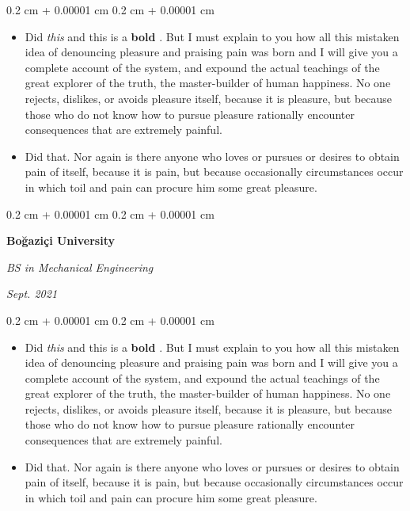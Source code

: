 \documentclass[10pt, letterpaper]{article}
\newenvironment{highlights}{
    \begin{itemize}[
        topsep=0.10 cm,
        parsep=0.10 cm,
        partopsep=0pt,
        itemsep=0pt,
        leftmargin=0.4 cm + 10pt + 0.6 cm
    ]
}{
    \end{itemize}
} %
\newenvironment{onecolentry}{
    \begin{adjustwidth}{
        0.2 cm + 0.00001 cm
    }{
        0.2 cm + 0.00001 cm
    }
}{
    \end{adjustwidth}
} %
\newenvironment{threecolentry}[3][]{
    \onecolentry
    \def\thirdColumn{#3}
    \setcolumnwidth{0.6 cm, \fill, 4.5 cm}
    \begin{paracol}{3}
    #2 \switchcolumn
}{
    \switchcolumn \raggedleft \thirdColumn
    \end{paracol}
    \endonecolentry
} %
\let\hrefWithoutArrow\href
\renewcommand{\href}[2]{\hrefWithoutArrow{#1}{\mbox{\ifthenelse{\equal{#2}{}}{ }{#2 }\raisebox{.15ex}{\footnotesize \faExternalLink*}}}}
\begin{document}
        \vspace{0.10 cm-3px}
        \begin{onecolentry}
            \begin{highlights}
                \item Did \textit{this} and this is a \textbf{bold} \href{https://example.com}{link}. But I must explain to you how all this mistaken idea of denouncing pleasure and praising pain was born and I will give you a complete account of the system, and expound the actual teachings of the great explorer of the truth, the master-builder of human happiness. No one rejects, dislikes, or avoids pleasure itself, because it is pleasure, but because those who do not know how to pursue pleasure rationally encounter consequences that are extremely painful.
                \item Did that. Nor again is there anyone who loves or pursues or desires to obtain pain of itself, because it is pain, but because occasionally circumstances occur in which toil and pain can procure him some great pleasure.
            \end{highlights}
        \end{onecolentry}


        \vspace{0.2 cm-3px}

        \begin{threecolentry}{
            \vspace*{\fill}
            \textbullet
            \vspace*{3px}
            \vspace*{\fill}
        }{
            
            
        \textit{Sept. 2021}}
            \textbf{Boğaziçi University}

            \textit{BS in Mechanical Engineering}
        \end{threecolentry}

        \vspace{0.10 cm-3px}
        \begin{onecolentry}
            \begin{highlights}
                \item Did \textit{this} and this is a \textbf{bold} \href{https://example.com}{link}. But I must explain to you how all this mistaken idea of denouncing pleasure and praising pain was born and I will give you a complete account of the system, and expound the actual teachings of the great explorer of the truth, the master-builder of human happiness. No one rejects, dislikes, or avoids pleasure itself, because it is pleasure, but because those who do not know how to pursue pleasure rationally encounter consequences that are extremely painful.
                \item Did that. Nor again is there anyone who loves or pursues or desires to obtain pain of itself, because it is pain, but because occasionally circumstances occur in which toil and pain can procure him some great pleasure.
            \end{highlights}
        \end{onecolentry}
\end{document}

